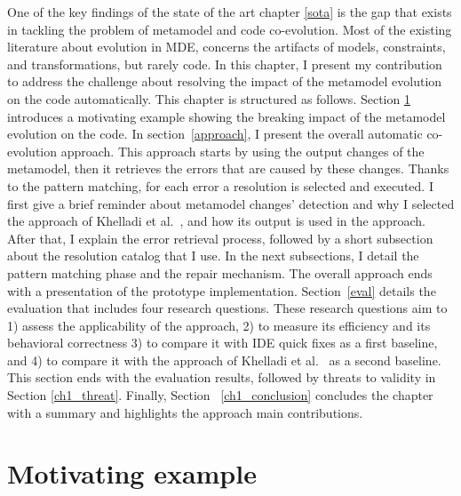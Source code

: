 One of the key findings of the state of the art chapter \ref{sota} is the gap that exists in tackling the problem of metamodel and code co-evolution. Most of the existing literature about evolution in MDE, concerns the artifacts of models, constraints, and transformations, but rarely code. In this chapter, I present my contribution to address the challenge  about resolving the impact of the metamodel evolution on the code automatically. 
This chapter is structured as follows. Section \ref{example} introduces a motivating example showing the breaking impact of the metamodel evolution on the code. 
In section~\ref{approach}, I present the overall automatic co-evolution approach. This approach starts by using the output changes of the metamodel, then it retrieves the errors that are caused by these changes. Thanks to the pattern matching, for each error a resolution is selected and executed. I first give a brief reminder about metamodel changes' detection and why I selected the approach of Khelladi et al.~\cite{khelladi2016detecting}, and how its output is used in the approach. After that, I explain the error retrieval process, followed by a short subsection about the resolution catalog that I use. In the next subsections, I detail the pattern matching phase and the repair mechanism. The overall approach ends with a presentation of the prototype implementation.
Section~\ref{eval} details the evaluation that includes four research questions. These research questions aim to 1) assess the applicability of the approach, 2) to measure its efficiency and its behavioral correctness 3) to compare it with IDE quick fixes as a first baseline, and 4) to compare it with the approach of Khelladi et al.~\cite{Khelladi2020} as a second baseline. This section ends with the evaluation results, followed by threats to validity in Section \ref{ch1_threat}. Finally, Section~ \ref{ch1_conclusion} concludes the chapter with a summary and highlights the approach main contributions. %

\label{sec: ap1_changedetection}

\section{Motivating example}\label{example}

